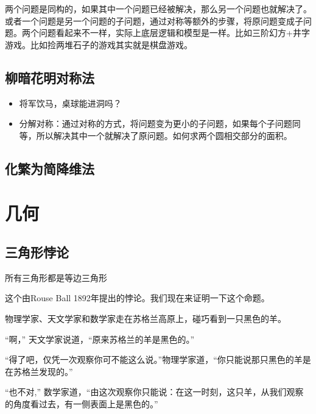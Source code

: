 \documentclass[12pt, letterpaper]{ctexrep}
\newenvironment{shadedquotation}
 {\begin{shaded*}
  \quoting[leftmargin=5pt, rightmargin=5pt, vskip=0pt]
 }
 {\endquoting
 \end{shaded*}
}
\begin{document}
两个问题是同构的，如果其中一个问题已经被解决，那么另一个问题也就解决了。或者一个问题是另一个问题的子问题，通过对称等额外的步骤，将原问题变成子问题。两个问题看起来不一样，实际上底层逻辑和模型是一样。比如三阶幻方+井字游戏。比如捡两堆石子的游戏其实就是棋盘游戏。


\section{柳暗花明对称法}

\begin{itemize}
\item{ 将军饮马，桌球能进洞吗？ }
\item{ 分解对称：通过对称的方式，将问题变为更小的子问题，如果每个子问题同等，所以解决其中一个就解决了原问题。如何求两个圆相交部分的面积。 }
\end{itemize}



\section{化繁为简降维法}




\chapter{几何}


\section{三角形悖论}
\begin{shadedquotation}
\noindent
所有三角形都是等边三角形
\end{shadedquotation}


这个由Rouse Ball 1892年提出的悖论。我们现在来证明一下这个命题。

\begin{center}

\end{center}

\begin{shadedquotation}
\noindent
物理学家、天文学家和数学家走在苏格兰高原上，碰巧看到一只黑色的羊。
\noindent

\noindent
“啊，” 天文学家说道，“原来苏格兰的羊是黑色的。”
\noindent

\noindent
“得了吧，仅凭一次观察你可不能这么说。”物理学家道，“你只能说那只黑色的羊是在苏格兰发现的。”
\noindent

\noindent
“也不对,” 数学家道，“由这次观察你只能说：在这一时刻，这只羊，从我们观察的角度看过去，有一侧表面上是黑色的。”
\end{shadedquotation}
\end{document}
